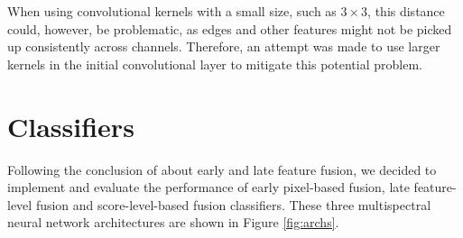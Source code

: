 \documentclass{l4proj}
\begin{document}
When using convolutional kernels with a small size, such as $3 \times 3$, this distance could, however, be problematic, as edges and other features might not be picked up consistently across channels. Therefore, an attempt was made to use larger kernels in the initial convolutional layer to mitigate this potential problem.


\section{Classifiers}
\label{design_classifiers}

Following the conclusion of \citet{wagner_multispectral_2016} about early and late feature fusion, we decided to implement and evaluate the performance of early pixel-based fusion, late feature-level fusion and score-level-based fusion classifiers. These three multispectral neural network architectures are shown in Figure \ref{fig:archs}.
\end{document}
